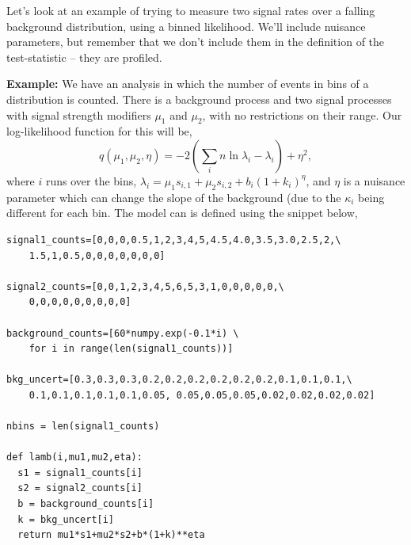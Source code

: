 Let's look at an example of trying to measure two signal rates over a falling background distribution, using a binned likelihood. We'll include nuisance parameters, but remember that we don't include them in the definition of the test-statistic -- they are profiled.  

\begin{tcolorbox}[colback=backblue]
\textbf{Example:} We have an analysis in which the number of events in bins of a distribution is counted. There is a background process and two signal processes with signal strength modifiers $\mu_1$ and $\mu_2$, with no restrictions on their range. Our log-likelihood function for this will be, 
\begin{equation}
    q(\mu_1,\mu_2,\eta) = -2 \left(\sum_{i} n\ln{\lambda_{i}}- \lambda_{i} \right) + \eta^{2},
\end{equation}
where $i$ runs over the bins, $\lambda_{i}=\mu_{1}s_{i,1}+\mu_{2}s_{i,2}+b_{i}(1+k_{i})^{\eta}$,
and $\eta$ is a nuisance parameter which can change the slope of the background (due to the $\kappa_{i}$ being different for each bin. 
The model can is defined using the snippet below, 
\begin{lstlisting}[style = Python]
signal1_counts=[0,0,0,0.5,1,2,3,4,5,4.5,4.0,3.5,3.0,2.5,2,\ 
    1.5,1,0.5,0,0,0,0,0,0,0]
    
signal2_counts=[0,0,1,2,3,4,5,6,5,3,1,0,0,0,0,0,\ 
    0,0,0,0,0,0,0,0,0]
    
background_counts=[60*numpy.exp(-0.1*i) \
    for i in range(len(signal1_counts))]
    
bkg_uncert=[0.3,0.3,0.3,0.2,0.2,0.2,0.2,0.2,0.2,0.1,0.1,0.1,\
    0.1,0.1,0.1,0.1,0.1,0.05, 0.05,0.05,0.05,0.02,0.02,0.02,0.02]
    
nbins = len(signal1_counts)

def lamb(i,mu1,mu2,eta):
  s1 = signal1_counts[i]
  s2 = signal2_counts[i]
  b = background_counts[i]
  k = bkg_uncert[i]
  return mu1*s1+mu2*s2+b*(1+k)**eta


\end{lstlisting}
\end{tcolorbox}
